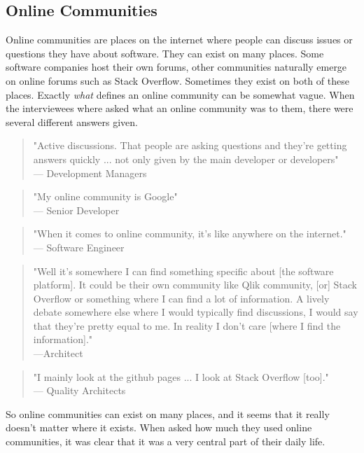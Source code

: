 \documentclass{cslthse-msc}
\begin{document}
    \subsection{Online Communities}
    Online communities are places on the internet where people can discuss issues or questions they have about software. They can exist on many places. Some software companies host their own forums, other communities naturally emerge on online forums such as Stack Overflow. Sometimes they exist on both of these places. Exactly \textit{what} defines an online community can be somewhat vague. When the interviewees where asked what an online community was to them, there were several different answers given.
    \begin{quote}
        "Active discussions. That people are asking questions and they're getting answers quickly ... not only given by the main developer or developers" \\
        --- Development Managers
    \end{quote}
    \begin{quote}
        "My online community is Google"\\
        --- Senior Developer
    \end{quote}
    \begin{quote}
        "When it comes to online community, it's like anywhere on the internet."\\
        --- Software Engineer
    \end{quote}
    \begin{quote}
        "Well it's somewhere I can find something specific about [the software platform]. It could be their own community like Qlik community, [or] Stack Overflow or something where I can find a lot of information. A lively debate somewhere else where I would typically find discussions, I would say that they're pretty equal to me. In reality I don't care [where I find the information]."
        \\---Architect
    \end{quote}
    \begin{quote}
        "I mainly look at the github pages ... I look at Stack Overflow [too]."\\
        --- Quality Architects
    \end{quote}
    So online communities can exist on many places, and it seems that it really doesn't matter where it exists. When asked how much they used online communities, it was clear that it was a very central part of their daily life.
\end{document}
